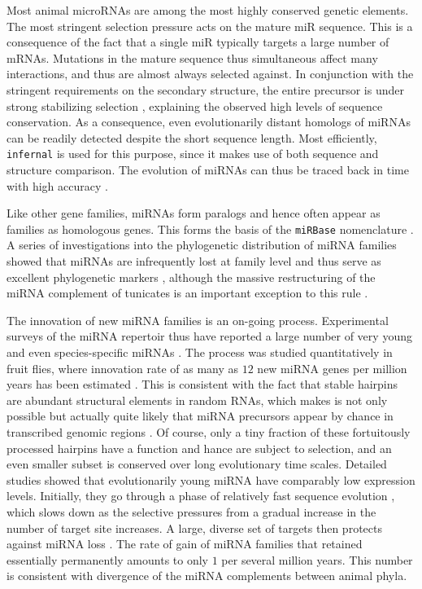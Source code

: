 \documentclass[graybox]{svmult}
\begin{document}
Most animal microRNAs are among the most highly conserved genetic elements.
The most stringent selection pressure acts on the mature miR sequence. This
is a consequence of the fact that a single miR typically targets a large
number of mRNAs. Mutations in the mature sequence thus simultaneous affect
many interactions, and thus are almost always selected against. In
conjunction with the stringent requirements on the secondary structure, the
entire precursor is under strong stabilizing selection \cite{Price:11},
explaining the observed high levels of sequence conservation. As a
consequence, even evolutionarily distant homologs of miRNAs can be readily
detected despite the short sequence length. Most efficiently,
\texttt{infernal} \cite{Nawrocki:13} is used for this purpose, since it
makes use of both sequence and structure comparison.  The evolution of
miRNAs can thus be traced back in time with high accuracy
\cite{Hertel:06a}. 

Like other gene families, miRNAs form paralogs \cite{Tanzer:04a, Hertel:12a}
and hence often appear as families as homologous genes. This forms the
basis of the \texttt{miRBase} nomenclature \cite{Ambrose:03a}. A series of
investigations into the phylogenetic distribution of miRNA families showed
that miRNAs are infrequently lost at family level and thus serve as
excellent phylogenetic markers
\cite{Sempere:06, Heimberg:08, Heimberg:10, Wheeler:09}, although the massive
restructuring of the miRNA complement of tunicates is an important
exception to this rule \cite{Fu:08}.

The innovation of new miRNA families is an on-going process. Experimental
surveys of the miRNA repertoir thus have reported a large number of very
young and even species-specific miRNAs \cite{Bentwich:05, Berezikov:06}. The
process was studied quantitatively in fruit flies, where innovation rate of
as many as $12$ new miRNA genes per million years has been estimated
\cite{Lu:08}. This is consistent with the fact that stable hairpins are
abundant structural elements in random RNAs, which makes is not only
possible but actually quite likely that miRNA precursors appear by chance
in transcribed genomic regions \cite{Tanzer:04a, CampoPaysaa:11, Marco:13}.
Of course, only a tiny fraction of these fortuitously processed hairpins
have a function and hance are subject to selection, and an even smaller
subset is conserved over long evolutionary time scales. Detailed studies
showed that evolutionarily young miRNA have comparably low expression
levels. Initially, they go through a phase of relatively fast sequence
evolution \cite{Liang:09, Meunier:12}, which slows down as the selective
pressures from a gradual increase in the number of target site increases. A
large, diverse set of targets then protects against miRNA loss
\cite{Lee:07a}. The rate of gain of miRNA families that retained
essentially permanently amounts to only $1$ per several million years. This
number is consistent with divergence of the miRNA complements between
animal phyla.
\end{document}
